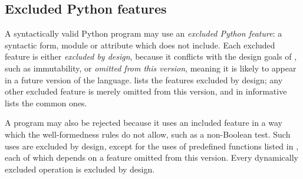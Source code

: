 \subsection{Excluded Python features}
\label{sec:excluded-features}

A syntactically valid Python program may use an \emph{excluded Python feature}: a syntactic form, module or attribute
which \PurePy does not include. Each excluded feature is either \emph{excluded by design}, because it conflicts
with the design goals of \PurePy, such as immutability, or \emph{omitted from this version}, meaning it is likely to
appear in a future version of the language.  lists the features excluded by design; any
other excluded feature is merely omitted from this version, and  in informative
 lists the common ones.

A program may also be rejected because it uses an included feature in a way which the well-formedness rules do not
allow, such as a non-Boolean test. Such uses are excluded by design, except for the uses of predefined functions
listed in , each of which depends on a feature omitted from this version. Every dynamically
excluded operation is excluded by design.




